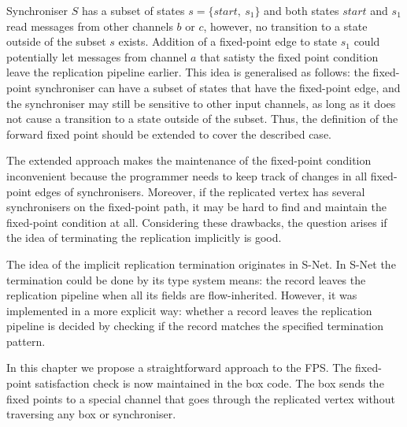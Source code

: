 Synchroniser $S$ has a subset of states $s=\{start, \: s_1\}$ and both states $start$ and $s_1$ read messages from other channels $b$ or $c$, however, no transition to a state outside of the subset $s$ exists. Addition of a fixed-point edge to state $s_1$ could potentially let messages from channel $a$ that satisty the fixed point condition leave the replication pipeline earlier. This idea is generalised as follows: the fixed-point synchroniser can have a subset of states that have the fixed-point edge, and the synchroniser may still be sensitive to other input channels, as long as it does not cause a transition to a state outside of the subset. Thus, the definition of the forward fixed point should be extended to cover the described case.

The extended approach makes the maintenance of the fixed-point condition inconvenient because the programmer needs to keep track of changes in all fixed-point edges of synchronisers. Moreover, if the replicated vertex has several synchronisers on the fixed-point path, it may be hard to find and maintain the fixed-point condition at all. Considering these drawbacks, the question arises if the idea of terminating the replication implicitly is good.


The idea of the implicit replication termination originates in S-Net. In S-Net the termination could be done by its type system means: the record leaves the replication pipeline when all its fields are flow-inherited. However, it was implemented in a more explicit way: whether a record leaves the replication pipeline is decided by checking if the record matches the specified termination pattern.


In this chapter we propose a straightforward approach to the FPS. The fixed-point satisfaction check is now maintained in the box code. The box sends the fixed points to a special channel that goes through the replicated vertex without traversing any box or synchroniser.



